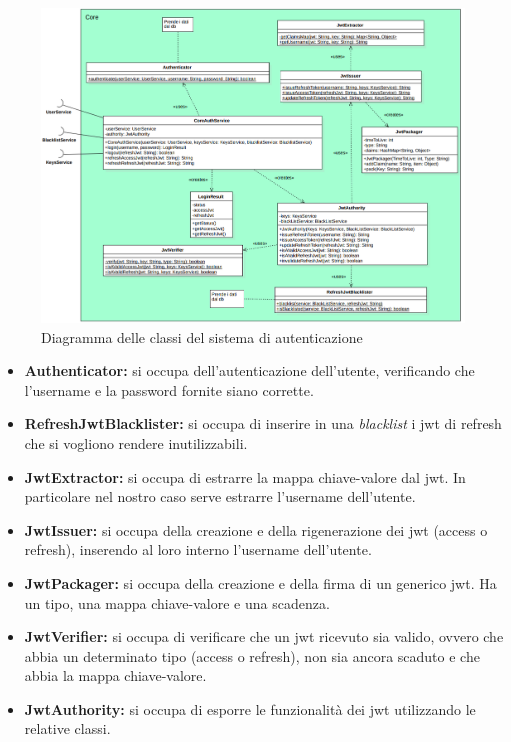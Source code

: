 \begin{figure}[h]
    \centering
    \includegraphics[width=\textwidth]{img/classi_auth.png}
    \caption{Diagramma delle classi del sistema di autenticazione}
    \label{fig:classi_auth}
\end{figure}

\begin{itemize}
    \item \textbf{Authenticator:} si occupa dell'autenticazione dell'utente, verificando che l'username e la password fornite siano corrette.
    \item \textbf{RefreshJwtBlacklister:} si occupa di inserire in una \textit{blacklist} i jwt di refresh che si vogliono rendere inutilizzabili.
    \item \textbf{JwtExtractor:} si occupa di estrarre la mappa chiave-valore dal jwt. In particolare nel nostro caso serve estrarre l'username dell'utente.
    \item \textbf{JwtIssuer:} si occupa della creazione e della rigenerazione dei jwt (access o refresh), inserendo al loro interno l'username dell'utente.
    \item \textbf{JwtPackager:} si occupa della creazione e della firma di un generico jwt. Ha un tipo, una mappa chiave-valore e una scadenza.
    \item \textbf{JwtVerifier:} si occupa di verificare che un jwt ricevuto sia valido, ovvero che abbia un determinato tipo (access o refresh), non sia ancora scaduto e che abbia la mappa chiave-valore.
    \item \textbf{JwtAuthority:} si occupa di esporre le funzionalità dei jwt utilizzando le relative classi.
\end{itemize}

